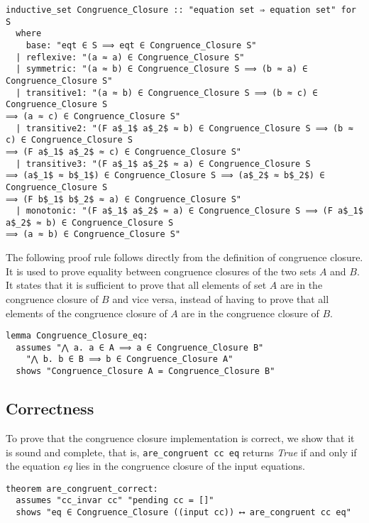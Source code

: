 \begin{lstlisting}
inductive_set Congruence_Closure :: "equation set ⇒ equation set" for S
  where
    base: "eqt ∈ S ⟹ eqt ∈ Congruence_Closure S"
  | reflexive: "(a ≈ a) ∈ Congruence_Closure S"
  | symmetric: "(a ≈ b) ∈ Congruence_Closure S ⟹ (b ≈ a) ∈ Congruence_Closure S"
  | transitive1: "(a ≈ b) ∈ Congruence_Closure S ⟹ (b ≈ c) ∈ Congruence_Closure S
⟹ (a ≈ c) ∈ Congruence_Closure S"
  | transitive2: "(F a$_1$ a$_2$ ≈ b) ∈ Congruence_Closure S ⟹ (b ≈ c) ∈ Congruence_Closure S
⟹ (F a$_1$ a$_2$ ≈ c) ∈ Congruence_Closure S"
  | transitive3: "(F a$_1$ a$_2$ ≈ a) ∈ Congruence_Closure S
⟹ (a$_1$ ≈ b$_1$) ∈ Congruence_Closure S ⟹ (a$_2$ ≈ b$_2$) ∈ Congruence_Closure S
⟹ (F b$_1$ b$_2$ ≈ a) ∈ Congruence_Closure S"
  | monotonic: "(F a$_1$ a$_2$ ≈ a) ∈ Congruence_Closure S ⟹ (F a$_1$ a$_2$ ≈ b) ∈ Congruence_Closure S
⟹ (a ≈ b) ∈ Congruence_Closure S"
\end{lstlisting}

The following proof rule follows directly from the definition of congruence closure. It is used to prove equality between congruence closures of the two sets $A$ and $B$. It states that it is sufficient to prove that all elements of set $A$ are in the congruence closure of $B$ and vice versa, instead of having to prove that all elements of the congruence closure of $A$ are in the congruence closure of $B$.

\begin{lstlisting}
lemma Congruence_Closure_eq:
  assumes "⋀ a. a ∈ A ⟹ a ∈ Congruence_Closure B"
    "⋀ b. b ∈ B ⟹ b ∈ Congruence_Closure A"
  shows "Congruence_Closure A = Congruence_Closure B"
\end{lstlisting}

\subsection{Correctness}
\label{subsection:uf-correctness}

To prove that the congruence closure implementation is correct, we show that it is sound and complete,
that is, \lstinline{are_congruent cc eq} returns \emph{True} if and only if the equation $eq$ lies in the congruence closure of the input equations.

\begin{lstlisting}
theorem are_congruent_correct:
  assumes "cc_invar cc" "pending cc = []"
  shows "eq ∈ Congruence_Closure ((input cc)) ⟷ are_congruent cc eq"
\end{lstlisting}

